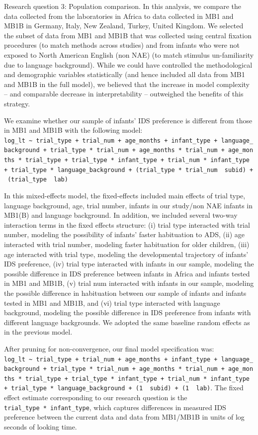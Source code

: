 \documentclass[
  english,
  ,man,floatsintext]{apa6}
\begin{document}
Research question 3: Population comparison. In this analysis, we compare the data collected from the laboratories in Africa to data collected in MB1 and MB1B in Germany, Italy, New Zealand, Turkey, United Kingdom. We selected the subset of data from MB1 and MB1B that was collected using central fixation procedures (to match methods across studies) and from infants who were not exposed to North American English (non NAE) (to match stimulus un-familiarity due to language background). While we could have controlled the methodological and demographic variables statistically (and hence included all data from MB1 and MB1B in the full model), we believed that the increase in model complexity -- and comparable decrease in interpretability -- outweighed the benefits of this strategy.

We examine whether our sample of infants' IDS preference is different from those in MB1 and MB1B with the following model:
\texttt{log\_lt\ \textasciitilde{}\ trial\_type\ +\ trial\_num\ +\ age\_months\ +\ infant\_type\ +\ language\_background\ +\ trial\_type\ *\ trial\_num\ +\ age\_months\ *\ trial\_num\ +\ age\_months\ *\ trial\_type\ +\ trial\_type\ *\ infant\_type\ +\ trial\_num\ *\ infant\_type\ +\ trial\_type\ *\ language\_background\ +\ (trial\_type\ *\ trial\_num\ \textbar{}\ subid)\ +\ (trial\_type\ \textbar{}\ lab)}

In this mixed-effects model, the fixed-effects included main effects of trial type, language background, age, trial number, infants in our study/non NAE infants in MB1(B) and language background. In addition, we included several two-way interaction terms in the fixed effects structure: (i) trial type interacted with trial number, modeling the possibility of infants' faster habituation to ADS, (ii) age interacted with trial number, modeling faster habituation for older children, (iii) age interacted with trial type, modeling the developmental trajectory of infants' IDS preference, (iv) trial type interacted with infants in our sample, modeling the possible difference in IDS preference between infants in Africa and infants tested in MB1 and MB1B, (v) trial num interacted with infants in our sample, modeling the possible difference in habituation between our sample of infants and infants tested in MB1 and MB1B, and (vi) trial type interacted with language background, modeling the possible difference in IDS preference from infants with different language backgrounds. We adopted the same baseline random effects as in the previous model.

After pruning for non-convergence, our final model specification was: \texttt{log\_lt\ \textasciitilde{}\ trial\_type\ +\ trial\_num\ +\ age\_months\ +\ infant\_type\ +\ language\_background\ +\ trial\_type\ *\ trial\_num\ +\ age\_months\ *\ trial\_num\ +\ age\_months\ *\ trial\_type\ +\ trial\_type\ *\ infant\_type\ +\ trial\_num\ *\ infant\_type\ +\ trial\_type\ *\ language\_background\ +\ (1\ \textbar{}\ subid)\ +\ (1\ \textbar{}\ lab)}. The fixed effect estimate corresponding to our research question is the \texttt{trial\_type\ *\ infant\_type}, which captures differences in measured IDS preference between the current data and data from MB1/MB1B in units of log seconds of looking time.
\end{document}
